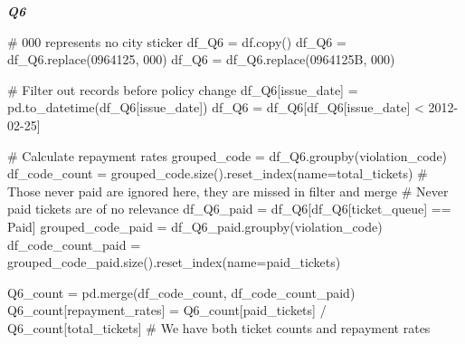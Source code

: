 \documentclass[
  letterpaper,
  DIV=11,
  numbers=noendperiod]{scrartcl}
\newenvironment{Shaded}{\begin{snugshade}}{\end{snugshade}}
\newcommand{\CommentTok}[1]{\textcolor[rgb]{0.37,0.37,0.37}{#1}}
\newcommand{\NormalTok}[1]{\textcolor[rgb]{0.00,0.23,0.31}{#1}}
\newcommand{\OperatorTok}[1]{\textcolor[rgb]{0.37,0.37,0.37}{#1}}
\newcommand{\StringTok}[1]{\textcolor[rgb]{0.13,0.47,0.30}{#1}}
\begin{document}
\textbf{\emph{Q6}}

\begin{Shaded}
\begin{Highlighting}[]
\CommentTok{\# 000 represents no city sticker}
\NormalTok{df\_Q6 }\OperatorTok{=}\NormalTok{ df.copy()}
\NormalTok{df\_Q6 }\OperatorTok{=}\NormalTok{ df\_Q6.replace(}\StringTok{\textquotesingle{}0964125\textquotesingle{}}\NormalTok{, }\StringTok{\textquotesingle{}000\textquotesingle{}}\NormalTok{)}
\NormalTok{df\_Q6 }\OperatorTok{=}\NormalTok{ df\_Q6.replace(}\StringTok{\textquotesingle{}0964125B\textquotesingle{}}\NormalTok{, }\StringTok{\textquotesingle{}000\textquotesingle{}}\NormalTok{)}

\CommentTok{\# Filter out records before policy change}
\NormalTok{df\_Q6[}\StringTok{\textquotesingle{}issue\_date\textquotesingle{}}\NormalTok{] }\OperatorTok{=}\NormalTok{ pd.to\_datetime(df\_Q6[}\StringTok{\textquotesingle{}issue\_date\textquotesingle{}}\NormalTok{])}
\NormalTok{df\_Q6 }\OperatorTok{=}\NormalTok{ df\_Q6[df\_Q6[}\StringTok{\textquotesingle{}issue\_date\textquotesingle{}}\NormalTok{] }\OperatorTok{\textless{}} \StringTok{\textquotesingle{}2012{-}02{-}25\textquotesingle{}}\NormalTok{]}

\CommentTok{\# Calculate repayment rates}
\NormalTok{grouped\_code }\OperatorTok{=}\NormalTok{ df\_Q6.groupby(}\StringTok{\textquotesingle{}violation\_code\textquotesingle{}}\NormalTok{)}
\NormalTok{df\_code\_count }\OperatorTok{=}\NormalTok{ grouped\_code.size().reset\_index(name}\OperatorTok{=}\StringTok{\textquotesingle{}total\_tickets\textquotesingle{}}\NormalTok{)}
\CommentTok{\# Those never paid are ignored here, they are missed in filter and merge}
\CommentTok{\# Never paid tickets are of no relevance}
\NormalTok{df\_Q6\_paid }\OperatorTok{=}\NormalTok{ df\_Q6[df\_Q6[}\StringTok{\textquotesingle{}ticket\_queue\textquotesingle{}}\NormalTok{] }\OperatorTok{==} \StringTok{\textquotesingle{}Paid\textquotesingle{}}\NormalTok{]}
\NormalTok{grouped\_code\_paid }\OperatorTok{=}\NormalTok{ df\_Q6\_paid.groupby(}\StringTok{\textquotesingle{}violation\_code\textquotesingle{}}\NormalTok{)}
\NormalTok{df\_code\_count\_paid }\OperatorTok{=}\NormalTok{ grouped\_code\_paid.size().reset\_index(name}\OperatorTok{=}\StringTok{\textquotesingle{}paid\_tickets\textquotesingle{}}\NormalTok{)}

\NormalTok{Q6\_count }\OperatorTok{=}\NormalTok{ pd.merge(df\_code\_count, df\_code\_count\_paid)}
\NormalTok{Q6\_count[}\StringTok{\textquotesingle{}repayment\_rates\textquotesingle{}}\NormalTok{] }\OperatorTok{=}\NormalTok{ Q6\_count[}\StringTok{\textquotesingle{}paid\_tickets\textquotesingle{}}\NormalTok{] }\OperatorTok{/}\NormalTok{ Q6\_count[}\StringTok{\textquotesingle{}total\_tickets\textquotesingle{}}\NormalTok{]}
\CommentTok{\# We have both ticket counts and repayment rates }


\end{Highlighting}
\end{Shaded}
\end{document}
